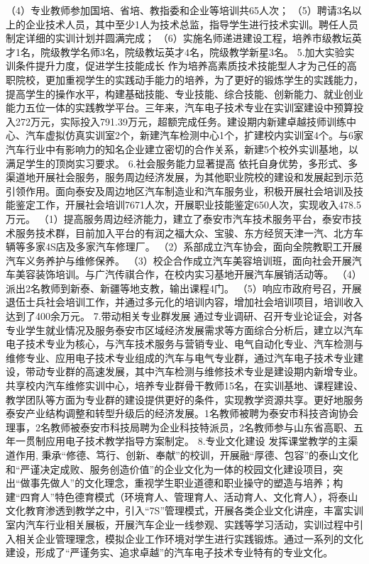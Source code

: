 （4）专业教师参加国培、省培、教指委和企业等培训共65人次；
（5）聘请3名以上的企业技术人员，其中至少1人为技术总监，指导学生进行技术实训。聘任人员制定详细的实训计划并圆满完成；
（6）实施名师递进建设工程，培养市级教坛英才1名，院级教学名师3名，院级教坛英才4名，院级教学新星3名。
5.加大实验实训条件提升力度，促进学生技能成长
作为培养高素质技术技能型人才为己任的高职院校，更加重视学生的实践动手能力的培养，为了更好的锻炼学生的实践能力，提高学生的操作水平，构建基础技能、专业技能、综合技能、创新能力、就业创业能力五位一体的实践教学平台。三年来，汽车电子技术专业在实训室建设中预算投入272万元，实际投入791.39万元，超额完成任务。建设期内新建卓越技师训练中心、汽车虚拟仿真实训室2个，新建汽车检测中心1个，扩建校内实训室4个。与6家汽车行业中有影响力的知名企业建立密切的合作关系，新建5个校外实训基地，以满足学生的顶岗实习要求。
6.社会服务能力显著提高
依托自身优势，多形式、多渠道地开展社会服务，服务周边经济发展，为其他职业院校的建设和发展起到示范引领作用。面向泰安及周边地区汽车制造业和汽车服务业，积极开展社会培训及技能鉴定工作，开展社会培训7671人次，开展职业技能鉴定650人次，实现收入478.5万元。
（1）提高服务周边经济能力，建立了泰安市汽车技术服务平台，泰安市技术服务技术群，目前加入平台的有润之福大众、宝骏、东方经贸天津一汽、北方车辆等多家4S店及多家汽车修理厂。
（2）系部成立汽车协会，面向全院教职工开展汽车义务养护与维修保养。
（3）校企合作成立汽车美容培训班，面向社会开展汽车美容装饰培训。与广汽传祺合作，在校内实习基地开展汽车展销活动等。
（4）派出2名教师到新泰、新疆等地支教，输出课程4门。
（5）响应市政府号召，开展退伍士兵社会培训工作，并通过多元化的培训内容，增加社会培训项目，培训收入达到了400余万元。
7.带动相关专业群发展
通过专业调研、召开专业论证会，对各专业学生就业情况及服务泰安市区域经济发展需求等方面综合分析后，建立以汽车电子技术专业为核心，与汽车技术服务与营销专业、电气自动化专业、汽车检测与维修专业、应用电子技术专业组成的汽车与电气专业群，通过汽车电子技术专业建设，带动专业群的高速发展，其中汽车检测与维修技术专业是建设期内新增专业。共享校内汽车维修实训中心，培养专业群骨干教师15名，在实训基地、课程建设、教学团队等方面为专业群的建设提供更好的条件，实现教学资源共享。更好地服务泰安产业结构调整和转型升级后的经济发展。1名教师被聘为泰安市科技咨询协会理事，2名教师被泰安市科技局聘为企业科技特派员，2名教师参与山东省高职、五年一贯制应用电子技术教学指导方案制定。
8.专业文化建设
发挥课堂教学的主渠道作用, 秉承“修德、笃行、创新、奉献”的校训，开展融“厚德、包容”的泰山文化和“严谨决定成败、服务创造价值”的企业文化为一体的校园文化建设项目，突出“做事先做人”的文化理念，重视学生职业道德和职业操守的塑造与培养；构建“四育人”特色德育模式（环境育人、管理育人、活动育人、文化育人），将泰山文化教育渗透到教学之中，引入“7S”管理模式，开展各类企业文化讲座，丰富实训室内汽车行业相关展板，开展汽车企业一线参观、实践等学习活动，实训过程中引入相关企业管理理念，模拟企业工作环境对学生进行实践锻炼。通过一系列的文化建设，形成了“严谨务实、追求卓越”的汽车电子技术专业特有的专业文化。
